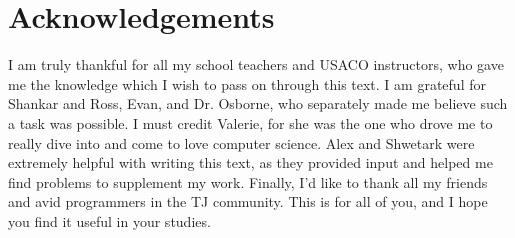 \chapter{Acknowledgements}

I am truly thankful for all my school teachers and USACO instructors, who gave me the knowledge which I wish to pass on through this text. I am grateful for Shankar and Ross, Evan, and Dr. Osborne, who separately made me believe such a task was possible. I must credit Valerie, for she was the one who drove me to really dive into and come to love computer science. Alex and Shwetark were extremely helpful with writing this text, as they provided input and helped me find problems to supplement my work. Finally, I'd like to thank all my friends and avid programmers in the TJ community. This is for all of you, and I hope you find it useful in your studies.


